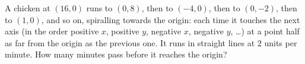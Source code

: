 A chicken at $(16,0)$ runs to $(0,8)$, then to $(-4,0)$, then to $(0,-2)$, then to $(1,0)$, and so on, spiralling towards the origin: each time it touches the next axis (in the order positive $x$, positive $y$, negative $x$, negative $y$, \dots) at a point half as far from the origin as the previous one. It runs in straight lines at $2$ units per minute. How many minutes pass before it reaches the origin?
